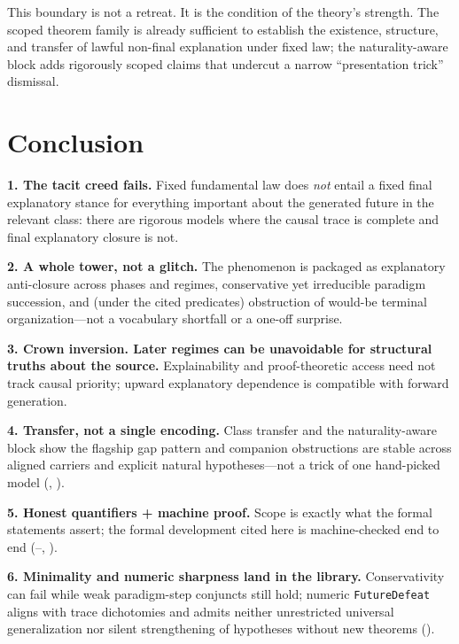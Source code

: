 \documentclass[11pt,a4paper]{article}
\newenvironment{keybox}[1]{%
  \Needspace*{8\baselineskip}%
  \begin{tcolorbox}[
    enhanced, breakable=false,
    colback=blue!5, colframe=blue!45!black, coltitle=black,
    colbacktitle=blue!14, boxrule=0.85pt, arc=2.5pt,
    left=9pt, right=9pt, top=6pt, bottom=6pt,
    titlerule=0.55pt, fonttitle=\bfseries, title={#1},
    before upper=\raggedright,
    before skip=0.9\baselineskip, after skip=0.9\baselineskip
  ]%
}{%
  \end{tcolorbox}%
}
\theoremstyle{definition}
\begin{document}
This boundary is not a retreat. It is the condition of the theory's strength. The scoped theorem family is already sufficient to establish the existence, structure, and transfer of lawful non-final explanation under fixed law; the naturality-aware block adds rigorously scoped claims that undercut a narrow ``presentation trick'' dismissal.

\section{Conclusion}

\begin{keybox}{Big payoffs}
\textbf{1. The tacit creed fails.} Fixed fundamental law does \emph{not} entail a fixed final explanatory stance for everything important about the generated future in the relevant class: there are rigorous models where the causal trace is complete and final explanatory closure is not.

\medskip
\textbf{2. A whole tower, not a glitch.} The phenomenon is packaged as explanatory anti-closure across phases and regimes, conservative yet irreducible paradigm succession, and (under the cited predicates) obstruction of would-be terminal organization---not a vocabulary shortfall or a one-off surprise.

\medskip
\textbf{3. Crown inversion. Later regimes can be unavoidable for structural truths about the source.} Explainability and proof-theoretic access need not track causal priority; upward explanatory dependence is compatible with forward generation.

\medskip
\textbf{4. Transfer, not a single encoding.} Class transfer and the naturality-aware block show the flagship gap pattern and companion obstructions are stable across aligned carriers and explicit natural hypotheses---not a trick of one hand-picked model (, ).

\medskip
\textbf{5. Honest quantifiers + machine proof.} Scope is exactly what the formal statements assert; the formal development cited here is machine-checked end to end (--, ).

\medskip
\textbf{6. Minimality and numeric sharpness land in the library.} Conservativity can fail while weak paradigm-step conjuncts still hold; numeric \texttt{FutureDefeat} aligns with trace dichotomies and admits neither unrestricted universal generalization nor silent strengthening of hypotheses without new theorems ().
\end{keybox}
\end{document}
